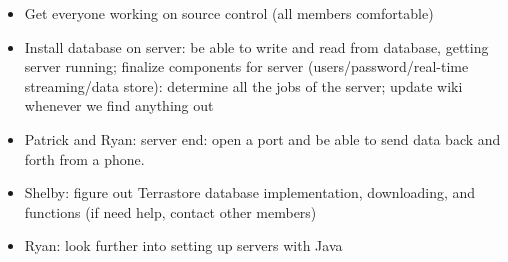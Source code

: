 \documentclass[11pt]{article} %
\begin{document}
\begin{itemize}
	\item Get everyone working on source control (all members comfortable)
       \item Install database on server: be able to write and read from database, getting server running; finalize components for server (users/password/real-time streaming/data store): determine all the jobs of the server; update wiki whenever we find anything out
       \item Patrick and Ryan: server end: open a port and be able to send data back and forth from a phone.
       \item Shelby: figure out Terrastore database implementation, downloading, and functions (if need help, contact other members)
       \item Ryan: look further into setting up servers with Java
\end{itemize}
\end{document}
